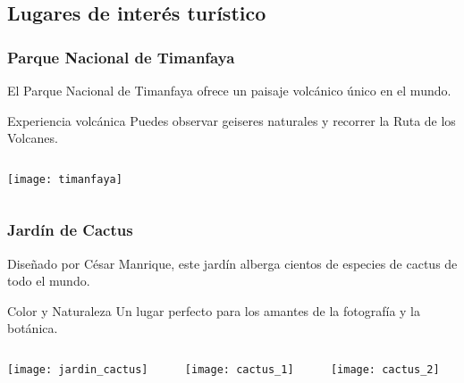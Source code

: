 \documentclass{beamer}
\begin{document}
	
	\begin{frame}
		\titlepage
	\end{frame}
	
	\begin{frame}
		\tableofcontents
	\end{frame}
	
	\begin{frame}
		\section{Lugares de interés turístico}
		\frametitle{Parque Nacional de Timanfaya}
		El Parque Nacional de Timanfaya ofrece un paisaje volcánico único en el mundo. 
		
		\begin{block}{Experiencia volcánica}
			Puedes observar geiseres naturales y recorrer la Ruta de los Volcanes.
		\end{block}
		
		\begin{columns}[c]
			\begin{column}{0.75\textwidth}
				\centering
				\texttt{[image: timanfaya]}
				
			\end{column}
		\end{columns}
		
	\end{frame}
	
	\begin{frame}
		\frametitle{Jardín de Cactus}
		Diseñado por César Manrique, este jardín alberga cientos de especies de cactus de todo el mundo.
		
		\begin{alertblock}{Color y Naturaleza}
			Un lugar perfecto para los amantes de la fotografía y la botánica.
		\end{alertblock}
		
		\begin{columns}[c]
			\begin{column}{0.33\textwidth}
				\centering
				\texttt{[image: jardin\_cactus]}
				\label{fig:jardin_cactus}
			\end{column}
			\begin{column}{0.33\textwidth}
				\centering
				\texttt{[image: cactus\_1]}
				\label{fig:cactus_1}
			\end{column}
			\begin{column}{0.33\textwidth}
				\centering
				\texttt{[image: cactus\_2]}
				\label{fig:cactus_2}
			\end{column}
		\end{columns}
		
	\end{frame}
	
\end{document}
